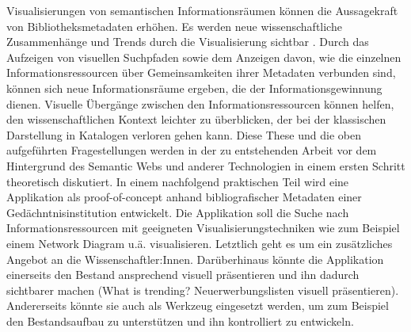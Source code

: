 \documentclass[10pt,a4paper,twocolumn,conference]{IEEEtran}
\begin{document}
Visualisierungen von semantischen Informationsräumen können die Aussagekraft von Bibliotheksmetadaten erhöhen. Es werden
neue wissenschaftliche Zusammenhänge und Trends durch die Visualisierung
sichtbar \cite{RN1}. Durch das Aufzeigen von visuellen Suchpfaden sowie dem
Anzeigen davon, wie die einzelnen Informationsressourcen über Gemeinsamkeiten ihrer
Metadaten verbunden sind, können sich neue Informationsräume ergeben, die der
Informationsgewinnung dienen. Visuelle Übergänge zwischen den
Informationsressourcen können helfen, den wissenschaftlichen Kontext leichter
zu überblicken, der bei der klassischen Darstellung in Katalogen verloren gehen kann. 
Diese These und die oben aufgeführten Fragestellungen werden in der zu
entstehenden Arbeit vor dem Hintergrund des Semantic Webs und
anderer Technologien in einem ersten Schritt theoretisch diskutiert.
In einem nachfolgend praktischen Teil wird eine Applikation als proof-of-concept anhand 
bibliografischer Metadaten einer Gedächntnisinstitution entwickelt. 
Die Applikation soll die Suche nach Informationsressourcen mit geeigneten
Visualisierungstechniken wie zum Beispiel einem Network Diagram u.ä. visualisieren. 
Letztlich geht es um ein zusätzliches Angebot an die Wissenschaftler:Innen. 
Darüberhinaus könnte die Applikation einerseits den Bestand ansprechend visuell
präsentieren und ihn dadurch sichtbarer machen (What is trending?
Neuerwerbungslisten visuell präsentieren). Andererseits könnte sie
auch als Werkzeug eingesetzt werden, um zum Beispiel den
Bestandsaufbau zu unterstützen und ihn kontrolliert zu entwickeln. 
\end{document}
